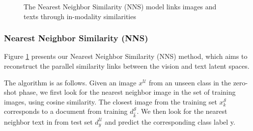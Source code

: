 \documentclass[11pt,a4paper]{article}
\newcommand\yuval[1]{\textcolor{darkpink}{\textbf{YUVAL:} #1 }}
\begin{document}
\begin{figure}[t]
\centering
{}
 \caption{The Nearest Neighbor Similarity (NNS) model links images and texts through in-modality similarities}
\label{fig:DS}
\end{figure}

\subsubsection{Nearest Neighbor Similarity (NNS)}

Figure \ref{fig:DS} presents our Nearest Neighbor Similarity (NNS) method, which aims to reconstruct the parallel similarity links between the vision and text latent spaces. 


The algorithm is as follows. Given an image $x^{\mathcal{U}}$ from an unseen class in the zero-shot phase,
we first look for the nearest neighbor image in the set of training images, using cosine similarity. The closest image from the training set $x^{\mathcal{S}}_k$ corresponds to a document from training $d^{\mathcal{S}}_{\hat{k}}$. We then look for the nearest neighbor text in from test set $d^{\mathcal{U}}_y$ and predict the corresponding class label y.
 
\end{document}

